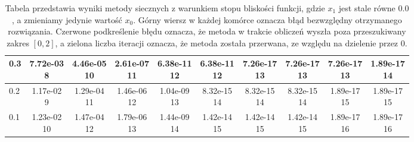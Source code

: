 \begin{table}[H]
\begin{tabular}{|l||c|c|c|c|c|c|c|c|c|}
\hline
 0.3 & \makecell{7.72e-03 \\ 8} & \makecell{4.46e-05 \\ 10} & \makecell{2.61e-07 \\ 11} & \makecell{6.38e-11 \\ 12} & \makecell{6.38e-11 \\ 12} & \makecell{7.26e-17 \\ 13} & \makecell{7.26e-17 \\ 13} & \makecell{7.26e-17 \\ 13} & \makecell{1.89e-17 \\ 14} \\
\hline
 0.2 & \makecell{1.17e-02 \\ 9} & \makecell{1.29e-04 \\ 11} & \makecell{1.46e-06 \\ 12} & \makecell{1.04e-09 \\ 13} & \makecell{8.32e-15 \\ 14} & \makecell{8.32e-15 \\ 14} & \makecell{8.32e-15 \\ 14} & \makecell{1.89e-17 \\ 15} & \makecell{1.89e-17 \\ 15} \\
\hline
 0.1 & \makecell{1.23e-02 \\ 10} & \makecell{1.47e-04 \\ 12} & \makecell{1.79e-06 \\ 13} & \makecell{1.44e-09 \\ 14} & \makecell{1.42e-14 \\ 15} & \makecell{1.42e-14 \\ 15} & \makecell{1.42e-14 \\ 15} & \makecell{1.89e-17 \\ 16} & \makecell{1.89e-17 \\ 16} \\
\hline
 \bottomrule
\end{tabular}
\caption{Tabela przedstawia wyniki metody siecznych z warunkiem stopu bliskości funkcji, gdzie $x_1$ jest stale równe $0.0$, a zmieniamy jedynie wartość $x_0$.
Górny wiersz w każdej komórce oznacza błąd bezwzględny otrzymanego rozwiązania.
Czerwone podkreślenie błędu oznacza, że metoda w trakcie obliczeń wyszła poza przeszukiwany zakres $[0,2]$, a zielona liczba iteracji oznacza, że metoda została
przerwana, ze względu na dzielenie przez 0.}
\label{tab:secant_fx_b}
\end{table}